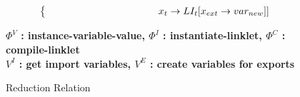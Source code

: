 \begin{figure}[!htbp]
{\begin{minipage}{0.93\textwidth}
\begin{align*}
\begin{cases*}
            \;        &\; \hspace{3.2cm} $x_t\rightarrow LI_t[x_{ext}\rightarrow var_{new}]]$
        \end{cases*} \\
      \end{align*}
    \end{minipage}%
  }
  \vspace{0.6em}
  \begin{center}
    \textbf{
      $\Phi^V$ : instance-variable-value, \quad
      $\Phi^I$ : instantiate-linklet, \quad
      $\Phi^C$ : compile-linklet\\
      $V^I$ : get import variables, \quad
      $V^E$ : create variables for exports
    }
  \end{center}
  \caption{Reduction Relation}
  \label{fig:linklets-reduction-relation}
\end{figure}



